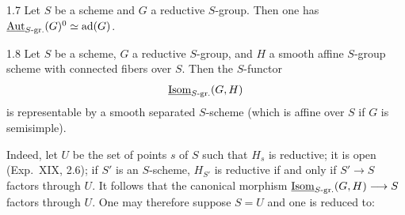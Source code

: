 \begin{corollary}{1.7}\label{XXIV.1.7}
Let $S$ be a scheme and $G$ a reductive $S$-group. Then one has $\underline{\operatorname{Aut}}_{S\text{-gr.}}(G)^0\simeq\operatorname{ad}(G)$.
\end{corollary}
\begin{corollary}{1.8}\label{XXIV.1.8}
Let $S$ be a scheme, $G$ a reductive $S$-group, and $H$ a smooth affine $S$-group scheme with connected fibers over $S$. Then the $S$-functor
\[
\underline{\operatorname{Isom}}_{S\text{-gr.}}(G,H)
\]
is representable by a smooth separated $S$-scheme (which is affine over $S$ if $G$ is semisimple).
\end{corollary}
Indeed, let $U$ be the set of points $s$ of $S$ such that $H_s$ is reductive; it is open (Exp.~XIX, 2.6); if $S'$ is an $S$-scheme, $H_{S'}$ is reductive if and only if $S'\to S$ factors through $U$. It follows that the canonical morphism $\underline{\operatorname{Isom}}_{S\text{-gr.}}(G,H)\longrightarrow S$ factors through $U$. One may therefore suppose $S=U$ and one is reduced to:

